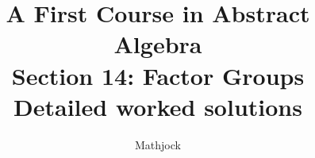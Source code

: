 
\title{\textbf{A First Course in Abstract Algebra}\\[0.3em]Section 14: Factor Groups\\[0.3em]\large Detailed worked solutions}
\author{Mathjock}
\date{}

\maketitle
\bookinfo
\tableofcontents
\clearpage
\renewcommand{\thesection}{14}
\renewcommand{\theHsection}{fraleigh.14}



